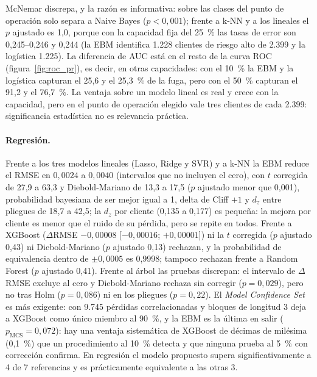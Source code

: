 McNemar discrepa, y la razón es informativa: sobre las clases del punto de operación solo separa a Naive
Bayes ($p < 0{,}001$); frente a k-NN y a los lineales el $p$ ajustado es 1,0, porque con la capacidad fija del
25~\% las tasas de error son 0,245--0,246 y 0,244 (la EBM identifica 1.228 clientes de riesgo alto de 2.399 y
la logística 1.225). La diferencia de AUC está en el resto de la curva ROC (figura~\ref{fig:roc_pr}),
es decir, en otras capacidades: con el 10~\% la EBM y la logística capturan el 25,6 y el 25,3~\% de la fuga,
pero con el 50~\% capturan el 91,2 y el 76,7~\%. La ventaja sobre un modelo lineal es real y crece con la
capacidad, pero en el punto de operación elegido vale tres clientes de cada 2.399: significancia estadística no
es relevancia práctica.

\paragraph{Regresión.}
Frente a los tres modelos lineales (Lasso, Ridge y SVR) y a k-NN la EBM reduce el RMSE en $0{,}0024$ a
$0{,}0040$ (intervalos que no incluyen el cero), con $t$ corregida de 27,9 a 63,3 y Diebold-Mariano de 13,3
a 17,5 ($p$ ajustado menor que 0,001), probabilidad bayesiana de ser mejor igual a 1, delta de Cliff $+1$ y
$d_z$ entre pliegues de 18,7 a 42,5; la $d_z$ por cliente (0,135 a 0,177) es pequeña: la mejora por cliente es
menor que el ruido de su pérdida, pero se repite en todos. Frente a XGBoost ($\Delta$RMSE $-0{,}00008$
[$-0{,}00016$; $+0{,}00001$]) ni la $t$ corregida ($p$ ajustado 0,43) ni Diebold-Mariano ($p$ ajustado 0,13)
rechazan, y la probabilidad de equivalencia dentro de $\pm 0{,}0005$ es 0,9998; tampoco rechazan frente a
Random Forest ($p$ ajustado 0,41). Frente al árbol las
pruebas discrepan: el intervalo de $\Delta$RMSE excluye al cero y Diebold-Mariano rechaza sin corregir
($p = 0{,}029$), pero no tras Holm ($p = 0{,}086$) ni en los pliegues ($p = 0{,}22$). El \emph{Model
Confidence Set} es más exigente: con 9.745 pérdidas correlacionadas y bloques de longitud 3 deja a XGBoost
como único miembro al 90~\%, y la EBM es la última en salir ($p_{\mathrm{MCS}} = 0{,}072$): hay una ventaja
sistemática de XGBoost de décimas de milésima (0,1~\%) que un procedimiento al 10~\% detecta y que ninguna
prueba al 5~\% con corrección confirma. En regresión el modelo propuesto supera significativamente a 4 de 7
referencias y es prácticamente equivalente a las otras 3.







